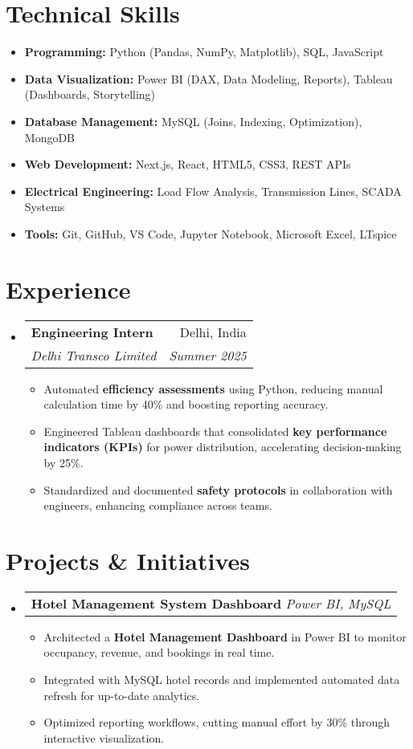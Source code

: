 \documentclass[a4paper,11pt]{article}
\makeatletter
\newcommand{\resumeItem}[1]{
  \item\small{{#1 \vspace{-2pt}}}
}
\newcommand{\resumeSubheading}[4]{
  \vspace{-2pt}\item
  \begin{tabular*}{0.97\textwidth}[t]{l@{\extracolsep{\fill}}r}
    \textbf{#1} & #2 \\
    \textit{\small#3} & \textit{\small #4} \\
  \end{tabular*}\vspace{-7pt}
}
\newcommand{\resumeProjectHeading}[2]{
  \vspace{-2pt}\item
  \begin{tabular*}{0.97\textwidth}[t]{l@{\extracolsep{\fill}}}
    \textbf{#1} \textit{\small#2} \\
  \end{tabular*}\vspace{-7pt}
}
\makeatother
\begin{document}
\section*{Technical Skills}
\begin{itemize}[leftmargin=*]
  \resumeItem{\textbf{Programming:} Python (Pandas, NumPy, Matplotlib), SQL, JavaScript}
  \resumeItem{\textbf{Data Visualization:} Power BI (DAX, Data Modeling, Reports), Tableau (Dashboards, Storytelling)}
  \resumeItem{\textbf{Database Management:} MySQL (Joins, Indexing, Optimization), MongoDB}
  \resumeItem{\textbf{Web Development:} Next.js, React, HTML5, CSS3, REST APIs}
  \resumeItem{\textbf{Electrical Engineering:} Load Flow Analysis, Transmission Lines, SCADA Systems}
  \resumeItem{\textbf{Tools:} Git, GitHub, VS Code, Jupyter Notebook, Microsoft Excel, LTspice}
\end{itemize}

\section*{Experience}
\begin{itemize}[leftmargin=*]
  \resumeSubheading
    {Engineering Intern}{Delhi, India}
    {Delhi Transco Limited}{Summer 2025}
    \begin{itemize}
        \resumeItem{Automated \textbf{efficiency assessments} using Python, reducing manual calculation time by 40\% and boosting reporting accuracy.}
        \resumeItem{Engineered Tableau dashboards that consolidated \textbf{key performance indicators (KPIs)} for power distribution, accelerating decision-making by 25\%.}
        \resumeItem{Standardized and documented \textbf{safety protocols} in collaboration with engineers, enhancing compliance across teams.}
    \end{itemize}
\end{itemize}

\section*{Projects \& Initiatives}
\begin{itemize}[leftmargin=*]
  \resumeProjectHeading
    {Hotel Management System Dashboard}{Power BI, MySQL}
    \begin{itemize}
        \resumeItem{Architected a \textbf{Hotel Management Dashboard} in Power BI to monitor occupancy, revenue, and bookings in real time.}
        \resumeItem{Integrated with MySQL hotel records and implemented automated data refresh for up-to-date analytics.}
        \resumeItem{Optimized reporting workflows, cutting manual effort by 30\% through interactive visualization.}
    \end{itemize}
\end{itemize}
\end{document}
